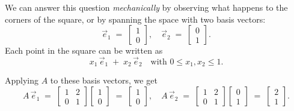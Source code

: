 \documentclass{report}
\begin{document}


\sol
We can answer this question \emph{mechanically} by observing what happens to the corners of the square, or by spanning the space with two basis vectors:
\[
	\vec{e}_1 \;=\;\begin{bmatrix}1\\0\end{bmatrix},\quad
	\vec{e}_2 \;=\;\begin{bmatrix}0\\1\end{bmatrix}.
\]
Each point in the square can be written as
\[
	x_1\,\vec{e}_1\;+\;x_2\,\vec{e}_2\quad\text{with }0\le x_1,x_2\le1.
\]

Applying $A$ to these basis vectors, we get
\[
	A\,\vec{e}_1 \;=\;
	\begin{bmatrix}
		1 & 2 \\[3pt]
		0 & 1
	\end{bmatrix}
	\begin{bmatrix}
		1 \\
		0
	\end{bmatrix}
	\;=\;
	\begin{bmatrix}
		1 \\
		0
	\end{bmatrix},
	\quad
	A\,\vec{e}_2 \;=\;
	\begin{bmatrix}
		1 & 2 \\[3pt]
		0 & 1
	\end{bmatrix}
	\begin{bmatrix}
		0 \\
		1
	\end{bmatrix}
	\;=\;
	\begin{bmatrix}
		2 \\
		1
	\end{bmatrix}.
\]
\end{document}
